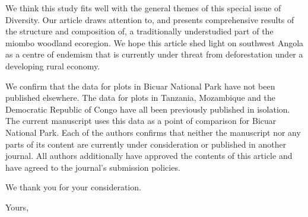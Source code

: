 \documentclass[a4paper]{letter}
\begin{document}
\begin{letter}{}
We think this study fits well with the general themes of this special issue of Diversity. Our article draws attention to, and presents comprehensive results of the structure and composition of, a traditionally understudied part of the miombo woodland ecoregion. We hope this article shed light on southwest Angola as a centre of endemism that is currently under threat from deforestation under a developing rural economy.

We confirm that the data for plots in Bicuar National Park have not been published elsewhere. The data for plots in Tanzania, Mozambique and the Democratic Republic of Congo have all been previously published in isolation. The current manuscript uses this data as a point of comparison for Bicuar National Park. Each of the authors confirms that neither the manuscript nor any parts of its content are currently under consideration or published in another journal. All authors additionally have approved the contents of this article and have agreed to the journal's submission policies. 

We thank you for your consideration.

\vspace{\parskip} %
\closing{Yours,}
\vspace{2\parskip} %




\end{letter}
 
\end{document}
